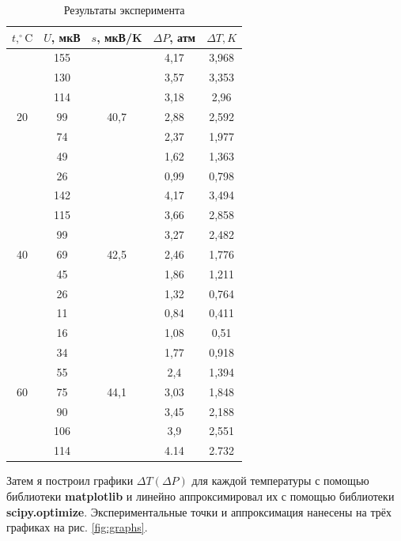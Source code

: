 \documentclass[12pt]{article}
\begin{document}
	\begin{table}[!h]
	\caption{Результаты эксперимента}
	\label{tbl:exp_res}
	\begin{center}
	\begin{tabular}{|c|c|c|c|c|}
	\hline
	$t, ^\circ\text{C}$ & $U$, мкВ & $s$, мкВ/K & $\Delta P$, атм & $\Delta T, K$ \\
	\hline
	\multirow{7}{*}{20} & 155 & \multirow{7}{*}{40,7} & 4,17 & 3,968 \\
	 & 130 &  & 3,57 & 3,353 \\
	 & 114 &  & 3,18 & 2,96 \\
	 & 99 &  & 2,88 & 2,592 \\
	 & 74 &  & 2,37 & 1,977 \\
	 & 49 &  & 1,62 & 1,363 \\
	 & 26 &  & 0,99 & 0,798 \\
	\hline
	\multirow{7}{*}{40} & 142 & \multirow{7}{*}{42,5} & 4,17 & 3,494 \\
	 & 115 &  & 3,66 & 2,858 \\
	 & 99 &  & 3,27 & 2,482 \\
	 & 69 &  & 2,46 & 1,776 \\
	 & 45 &  & 1,86 & 1,211 \\
	 & 26 &  & 1,32 & 0,764 \\
	 & 11 &  & 0,84 & 0,411 \\
	\hline
	\multirow{7}{*}{60} & 16 & \multirow{7}{*}{44,1} & 1,08 & 0,51 \\
	 & 34 &  & 1,77 & 0,918 \\
	 & 55 &  & 2,4 & 1,394 \\
	 & 75 &  & 3,03 & 1,848 \\
	 & 90 &  & 3,45 & 2,188 \\
	 & 106 &  & 3,9 & 2,551 \\
	 & 114 &  & 4.14 & 2.732 \\
	\hline
	\end{tabular}
	\end{center}
	\end{table}
	
	Затем я построил графики $\Delta T \left( \Delta P \right)$ для каждой температуры с помощью библиотеки \textbf{matplotlib} и линейно аппроксимировал их с помощью библиотеки \textbf{scipy.optimize}. Экспериментальные точки и аппроксимация нанесены на трёх графиках на рис. \ref{fig:graphs}.
	
\end{document}
